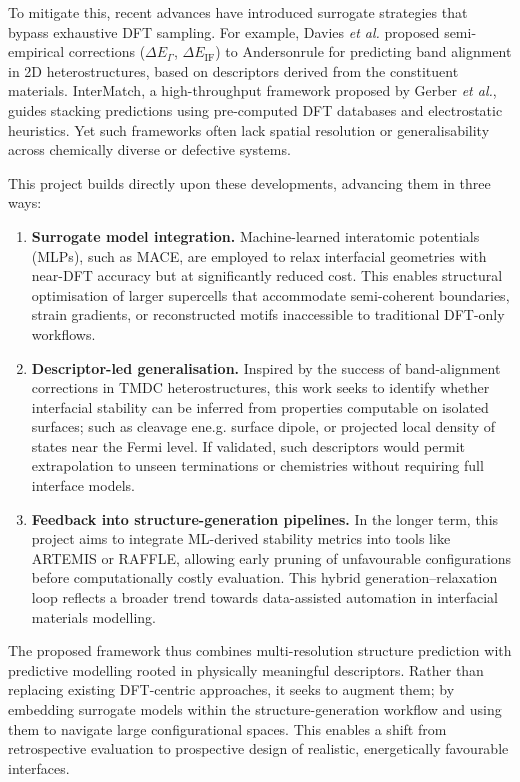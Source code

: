 To mitigate this, recent advances have introduced surrogate strategies that bypass exhaustive DFT sampling. For example, Davies \textit{et al.} proposed semi-empirical corrections (\(\Delta E_\Gamma\), \(\Delta E_{\mathrm{IF}}\)) to Anderson\rqss rule for predicting band alignment in 2D heterostructures, based on descriptors derived from the constituent materials. InterMatch, a high-throughput framework proposed by Gerber \textit{et al.}, guides stacking predictions using pre-computed DFT databases and electrostatic heuristics. Yet such frameworks often lack spatial resolution or generalisability across chemically diverse or defective systems. 
 
This project builds directly upon these developments, advancing them in three ways: 
 
\begin{enumerate}
    \item \textbf{Surrogate model integration.} Machine-learned interatomic potentials (MLPs), such as MACE, are employed to relax interfacial geometries with near-DFT accuracy but at significantly reduced cost. This enables structural optimisation of larger supercells that accommodate semi-coherent boundaries, strain gradients, or reconstructed motifs inaccessible to traditional DFT-only workflows.
    \item \textbf{Descriptor-led generalisation.} Inspired by the success of band-alignment corrections in TMDC heterostructures, this work seeks to identify whether interfacial stability can be inferred from properties computable on isolated surfaces; such as cleavage ene.g. surface dipole, or projected local density of states near the Fermi level. If validated, such descriptors would permit extrapolation to unseen terminations or chemistries without requiring full interface models.
    \item \textbf{Feedback into structure-generation pipelines.} In the longer term, this project aims to integrate ML-derived stability metrics into tools like \textsc{ARTEMIS} or \textsc{RAFFLE}, allowing early pruning of unfavourable configurations before computationally costly evaluation. This hybrid generation--relaxation loop reflects a broader trend towards data-assisted automation in interfacial materials modelling.
\end{enumerate}
 
The proposed framework thus combines multi-resolution structure prediction with predictive modelling rooted in physically meaningful descriptors. Rather than replacing existing DFT-centric approaches, it seeks to augment them; by embedding surrogate models within the structure-generation workflow and using them to navigate large configurational spaces. This enables a shift from retrospective evaluation to prospective design of realistic, energetically favourable interfaces. 
 

